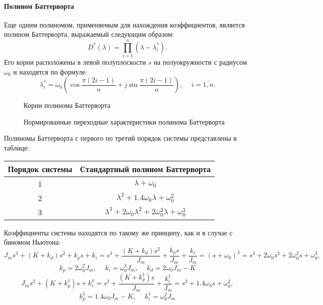 \paragraph*{Полином Баттерворта\\}
\hspace*{\parindent}Еще одним полиномом, применяемым для нахождения коэффициентов, является полином Баттерворта, выражаемый следующим образом: 
\begin{equation}
	D^*(\lambda)=\prod_{i=1}^{n}(\lambda-\lambda_i^*).
\end{equation}
Его корни расположены в левой полуплоскости $s$ на полуокружности с радиусом $\omega_0$ и находятся по формуле:
\begin{equation}
	\lambda_i^*=\omega_0(\cos{\frac{\pi(2i-1)}{n}}+j\sin{\frac{\pi(2i-1)}{n}}),\phantom{-}i=\overline{1,n}.
\end{equation}
\begin{figure}[h]
	\noindent{}
	\caption{Корни полинома Баттерворта}
\end{figure}

\begin{figure}[h]
	\noindent{}
	\caption{Нормированные переходные характеристики полинома Баттерворта}
	\label{buttergraph}
\end{figure}

Полиномы Баттерворта с первого по третий порядок системы представлены в таблице:
\begin{center}
\begin{tabular}{ |c|c| } 
 \hline
 Порядок системы &  Стандартный полином Баттерворта \\ 
 \hline
 1 & $\lambda+\omega_0$ \\ 
 \hline
 2 & $\lambda^2+1.4\omega_0\lambda+\omega_0^2$ \\ 
 \hline
 3 & $\lambda^3+2\omega_0\lambda^2+2\omega_0^2\lambda+\omega_0^3$ \\ 
 \hline
\end{tabular}
\end{center}

Коэффициенты системы находятся по такому же принципу, как и в случае с биномом Ньютона:
\begin{equation}
	J_ms^3+(K+k_d)s^2+k_ps+k_i = s^3+\frac{(K+k_d)s^2}{J_m}+\frac{k_ps}{J_m} +\frac{k_i}{J_m} =(s+\omega_0)^3= s^3+2\omega_0s^2+2\omega_0^2s+\omega_0^3,
\end{equation}
\begin{equation}
	k_p = 2\omega_0^2J_m, \phantom{- }k_i = \omega_0^3J_m, \phantom{- } k_d=2\omega_0J_m - K
\end{equation}
\begin{equation}
	J_ms^2+(K+k_p^1)s+k_i^1 = s^2+\frac{(K+k_p^1)s}{J_m}+\frac{k_i^1}{J_m} = s^2+1.4\omega_0s+\omega_0^2,
\end{equation}
\begin{equation}
	k_p^1 =1.4\omega_0J_m-K, \phantom{- }k_i^1 = \omega_0^2J_m
\end{equation}

